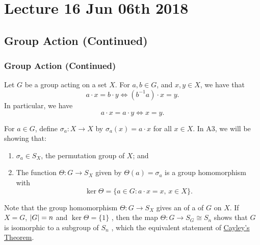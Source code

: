 \chapter{Lecture 16 Jun 06th 2018}%
\label{chp:lecture_16_jun_06th_2018}

\section{Group Action (Continued)}%
\label{sec:group_action_continued}

\subsection{Group Action (Continued)}%
\label{sub:group_action_continued}

\begin{remark}
  Let $G$ be a group acting on a set $X$. For $a, b \in G$, and $x, y \in X$, we have that
  \begin{equation*}
    a \cdot x = b \cdot y \iff (b^{-1} a) \cdot x = y.
  \end{equation*}
  In particular, we have
  \begin{equation*}
    a \cdot x = a \cdot y \iff x = y.
  \end{equation*}
\end{remark}

For $a \in G$, define $\sigma_a : X \to X$ by $\sigma_a(x) = a \cdot x$ for all $x \in X$. In A3, we will be showing that:
\begin{enumerate}
  \item $\sigma_a \in S_X$, the permutation group of $X$; and
  \item The function $\Theta : G \to S_X$ given by $\Theta(a) = \sigma_a$ is a group homomorphism with
    \begin{equation*}
      \ker \Theta = \{a \in G : a \cdot x = x, \, x \in X \}.
    \end{equation*}
\end{enumerate}

Note that the group homomorphism $\Theta : G \to S_X$ gives an  of a  of $G$ on $X$. If $X = G$, $\left|G\right| = n$ and $\ker \Theta = \{1\}$ , then the map $\Theta : G \to S_G \cong S_n$ shows that $G$ is isomorphic to a subgroup of $S_n$ , which the equivalent statement of \hyperref[thm:cayley_s_theorem]{Cayley's Theorem}.

